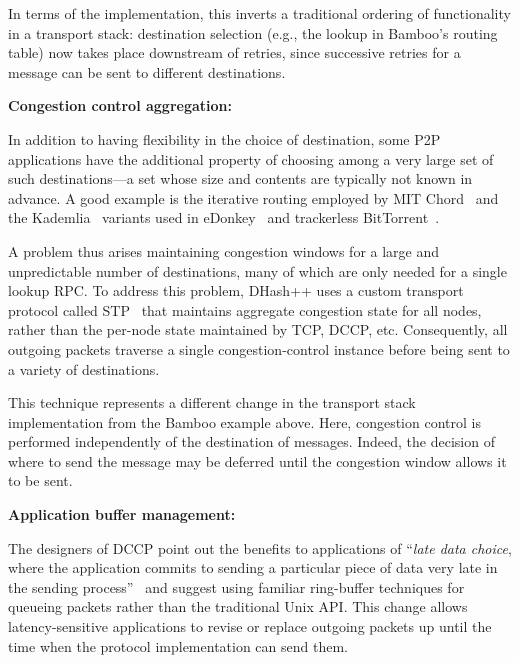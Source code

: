 \documentclass[10pt,twocolumn]{article}
\renewcommand{\subsection}[1]{\vspace{10pt}\noindent\textbf{#1:}\vspace{5pt}}
\begin{document}
In terms of the implementation, this inverts a
traditional ordering of functionality in a transport stack:
destination selection (e.g., the lookup in Bamboo's routing table)
now takes place downstream of retries, since successive
retries for a message can be sent to different destinations. 

\subsection{Congestion control aggregation}

\label{sec:unpredictableNextHop}
In addition to having flexibility in the choice of destination, some
P2P applications have the additional property of choosing among a very
large set of such destinations---a set whose size and contents are
typically not known in advance.  A good example
is the iterative routing employed by MIT
Chord~\cite{dabek_nsdi04} and the Kademlia~\cite{kademlia} variants used in
eDonkey~\cite{edonkey} and trackerless BitTorrent~\cite{bittorrent-dht}.  

A problem thus arises maintaining congestion windows for a
large and unpredictable number of destinations, many of which are only
needed for a single lookup RPC.  To address this problem,
DHash++ uses a custom transport protocol called
STP~\cite{dabek_nsdi04} that maintains aggregate congestion state for
all nodes, rather than the per-node state maintained by TCP, DCCP, etc. 
Consequently, all outgoing packets traverse a single
congestion-control instance before being sent to a variety of
destinations. 

This technique represents a different change in the
transport stack implementation from the Bamboo example above.  Here,
congestion control is performed independently of the destination of
messages.  Indeed, the decision of where to send the message may be
deferred until the congestion window allows it to be sent. 

\subsection{Application buffer management}
\label{sec:applicationBufferManagement}

The designers of DCCP point out the benefits to applications of
``\emph{late data choice}, where the application commits to sending a
particular piece of data very late in the sending
process''~\cite{dccp-api} and suggest using familiar ring-buffer
techniques for queueing packets rather than the traditional Unix API.
This change allows latency-sensitive applications to revise or replace
outgoing packets up until the time when the protocol
implementation can send them. 
\end{document}
